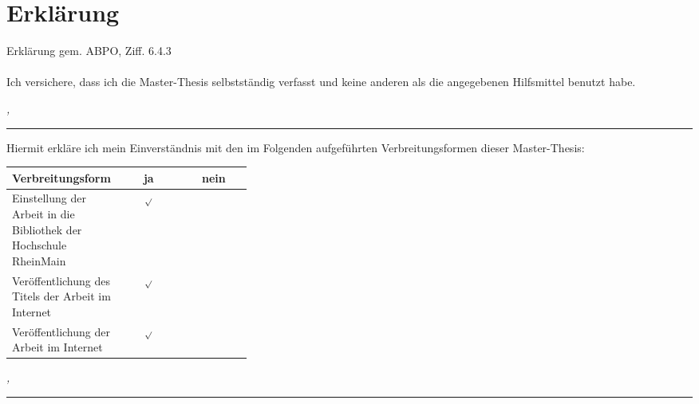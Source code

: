 %
\chapter*{Erklärung}
\label{sec:declaration}
\thispagestyle{empty}

Erklärung gem. ABPO, Ziff. 6.4.3 \\ \\
Ich versichere, dass ich die Master-Thesis selbstständig verfasst und keine anderen als die angegebenen Hilfsmittel benutzt habe.

\bigskip

\noindent\textit{\thesisUniversityCity, \thesisDate}

\smallskip

\begin{flushright}
	\begin{minipage}{5cm}
		\rule{\textwidth}{1pt}
		\centering\thesisName
	\end{minipage}
\end{flushright}

\bigskip

Hiermit erkläre ich mein Einverständnis mit den im Folgenden aufgeführten Verbreitungsformen dieser Master-Thesis:
\begin{longtable}{|p{0.35\linewidth}|c|c|}
 \hline
 \textbf{Verbreitungsform} & {\centering\textbf{~~ja~~}} & {\centering \textbf{~nein~}} \\
 \hline
 \endhead
 Einstellung der Arbeit in die Bibliothek der Hochschule RheinMain & \centering \( _{\surd } \) &\\
 \hline
 Veröffentlichung des Titels der Arbeit im Internet & \centering \( _{\surd } \) &\\
 \hline
 Veröffentlichung der Arbeit im Internet & \centering \( _{\surd } \) &\\
 \hline
\end{longtable}

\noindent\textit{\thesisUniversityCity, \thesisDate}

\smallskip

\begin{flushright}
	\begin{minipage}{5cm}
		\rule{\textwidth}{1pt}
		\centering\thesisName
	\end{minipage}
\end{flushright}

